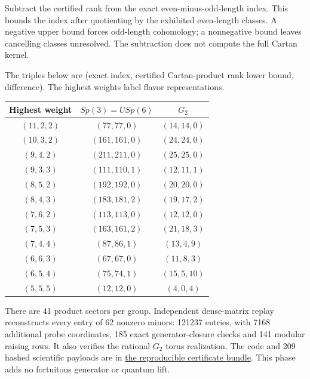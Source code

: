 \documentclass[11pt]{article}
\numberwithin{equation}{section}
\numberwithin{figure}{section}
\numberwithin{table}{section}
\begin{document}
Subtract the certified rank from the exact even-minus-odd-length index. This bounds the index after quotienting by the exhibited even-length classes. A negative upper bound forces odd-length cohomology; a nonnegative bound leaves cancelling classes unresolved. The subtraction does not compute the full Cartan kernel.

The triples below are (exact index, certified Cartan-product rank lower bound, difference). The highest weights label flavor representations.

\begin{center}
\small
\begin{tabular}{@{}ccc@{}}
\toprule
Highest weight & $Sp(3)=USp(6)$ & $G_2$\\
\midrule
$(11,2,2)$ & $(77,77,0)$ & $(14,14,0)$\\
$(10,3,2)$ & $(161,161,0)$ & $(24,24,0)$\\
$(9,4,2)$ & $(211,211,0)$ & $(25,25,0)$\\
$(9,3,3)$ & $(111,110,1)$ & $(12,11,1)$\\
$(8,5,2)$ & $(192,192,0)$ & $(20,20,0)$\\
$(8,4,3)$ & $(183,181,2)$ & $(19,17,2)$\\
$(7,6,2)$ & $(113,113,0)$ & $(12,12,0)$\\
$(7,5,3)$ & $(163,161,2)$ & $(21,18,3)$\\
$(7,4,4)$ & $(87,86,1)$ & $(13,4,9)$\\
$(6,6,3)$ & $(67,67,0)$ & $(11,8,3)$\\
$(6,5,4)$ & $(75,74,1)$ & $(15,5,10)$\\
$(5,5,5)$ & $(12,12,0)$ & $(4,0,4)$\\
\bottomrule
\end{tabular}
\end{center}

There are 41 product sectors per group. Independent dense-matrix replay reconstructs every entry of 62 nonzero minors: 121237 entries, with 7168 additional probe coordinates, 185 exact generator-closure checks and 141 modular raising rows. It also verifies the rational $G_2$ torus realization. The code and 209 hashed scientific payloads are in \href{https://github.com/lbotao399-stack/quantum-lifts-results/tree/main/algorithms/bmn_rank_certificates_20261117}{the reproducible certificate bundle}. This phase adds no fortuitous generator or quantum lift.
\end{document}
